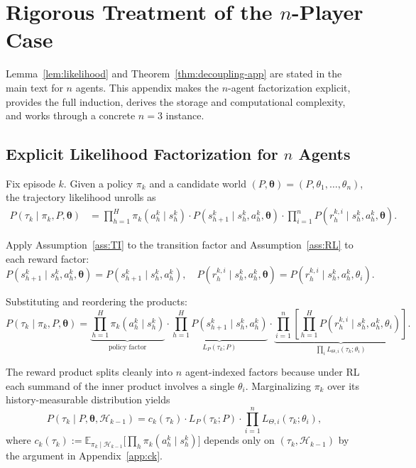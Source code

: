 \section{Rigorous Treatment of the \texorpdfstring{$n$}{n}-Player Case}
\label{app:n-player}

Lemma~\ref{lem:likelihood} and Theorem~\ref{thm:decoupling-app} are stated in the main text for $n$ agents. This appendix makes the $n$-agent factorization explicit, provides the full induction, derives the storage and computational complexity, and works through a concrete $n=3$ instance.

\subsection{Explicit Likelihood Factorization for \texorpdfstring{$n$}{n} Agents}

Fix episode $k$. Given a policy $\pi_k$ and a candidate world $(P, \boldsymbol{\theta}) = (P, \theta_1, \ldots, \theta_n)$, the trajectory likelihood unrolls as
\begin{align}
P(\tau_k \mid \pi_k, P, \boldsymbol{\theta}) &= \prod_{h=1}^H \pi_k(a_h^k \mid s_h^k) \cdot P(s_{h+1}^k \mid s_h^k, a_h^k, \boldsymbol{\theta}) \cdot \prod_{i=1}^n P(r_h^{k,i} \mid s_h^k, a_h^k, \boldsymbol{\theta}). \label{eq:n-lik-raw}
\end{align}

Apply Assumption~\ref{ass:TI} to the transition factor and Assumption~\ref{ass:RL} to each reward factor:
\begin{equation}
P(s_{h+1}^k \mid s_h^k, a_h^k, \boldsymbol{\theta}) = P(s_{h+1}^k \mid s_h^k, a_h^k), \quad P(r_h^{k,i} \mid s_h^k, a_h^k, \boldsymbol{\theta}) = P(r_h^{k,i} \mid s_h^k, a_h^k, \theta_i).
\end{equation}

Substituting and reordering the products:
\begin{equation}
P(\tau_k \mid \pi_k, P, \boldsymbol{\theta}) = \underbrace{\prod_{h=1}^H \pi_k(a_h^k \mid s_h^k)}_{\text{policy factor}} \cdot \underbrace{\prod_{h=1}^H P(s_{h+1}^k \mid s_h^k, a_h^k)}_{L_P(\tau_k; P)} \cdot \underbrace{\prod_{i=1}^n \left[\prod_{h=1}^H P(r_h^{k,i} \mid s_h^k, a_h^k, \theta_i)\right]}_{\prod_i L_{\Theta,i}(\tau_k; \theta_i)}.
\end{equation}

The reward product splits cleanly into $n$ agent-indexed factors because under RL each summand of the inner product involves a single $\theta_i$. Marginalizing $\pi_k$ over its history-measurable distribution yields
\begin{equation}
\label{eq:n-lik-factor}
P(\tau_k \mid P, \boldsymbol{\theta}, \mathcal{H}_{k-1}) = c_k(\tau_k) \cdot L_P(\tau_k; P) \cdot \prod_{i=1}^n L_{\Theta,i}(\tau_k; \theta_i),
\end{equation}
where $c_k(\tau_k) := \mathbb{E}_{\pi_k \mid \mathcal{H}_{k-1}}\big[\prod_h \pi_k(a_h^k \mid s_h^k)\big]$ depends only on $(\tau_k, \mathcal{H}_{k-1})$ by the argument in Appendix~\ref{app:ck}.

